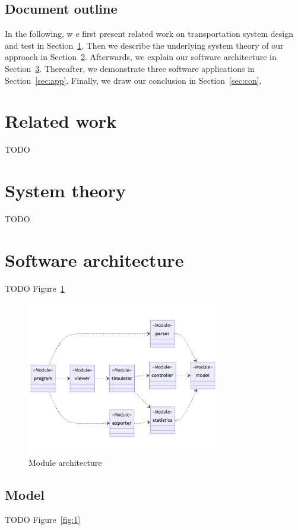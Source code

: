 \documentclass{article}
\begin{document}
    \subsection*{Document outline}
    In the following, w e first present related work on transportation system design and test in Section~\ref{sec:related}.
    Then we describe the underlying system theory of our approach in Section~\ref{sec:theory}.
    Afterwards, we explain our software architecture in Section~\ref{sec:arch}.
    Thereafter, we demonstrate three software applications in Section~\ref{sec:app}.
    Finally, we draw our conclusion in Section~\ref{sec:con}.

    \section{Related work}
    \label{sec:related}
    TODO

    \section{System theory}
    \label{sec:theory}
    TODO

    \section{Software architecture}
    \label{sec:arch}
    TODO Figure~\ref{fig:0}

    \begin{figure}
        \centering
        \includegraphics[width=0.75\textwidth]{../../diagrams/architecture.png}
        \caption{Module architecture}
        \label{fig:0}
    \end{figure}

    \subsection{Model}
    TODO Figure~\ref{fig:1}
\end{document}
